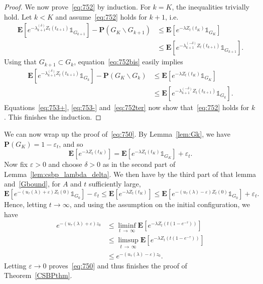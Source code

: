 \documentclass[AHL,Unicode,longabstracts,published]{cedram}
\newcommand*\ep{\varepsilon}
\newcommand*\eps{\varepsilon}
\newcommand*\E{\mathbf{E}}
\renewcommand*\P{\mathbf{P}}
\newcommand{\1} {\mathds{1}}
\renewcommand*\to{\rightarrow}
\begin{document}
\begin{proof}
We now prove~\eqref{eq:752} by induction. For $k=K$, the inequalities trivially hold. Let $k<K$ and assume~\eqref{eq:752} holds for $k+1$, i.e.
\begin{equation}\label{eq:752bis}
\begin{split}
\E\left[e^{-\lambda_{k+1}^{(\delta)}Z_t\left(t_{k+1}\right)}\1_{G_{k+1}}\right] -\P\left(G_K\backslash G_{k+1}\right)
&\le \E\left[e^{-\lambda Z_t(t_K)}\1_{G_K}\right]\\
&\le \E\left[e^{-\lambda_{k+1}^{(-\delta)}Z_t\left(t_{k+1}\right)}\1_{G_{k+1}}\right].
\end{split}
\end{equation}
Using that $G_{k+1}\subset G_k$, equation~\eqref{eq:752bis} easily implies
\begin{equation}\label{eq:752ter}
\begin{split}
\E\left[e^{-\lambda_{k+1}^{(\delta)}Z_t\left(t_{k+1}\right)}\1_{G_k}\right] -\P\left(G_K\backslash G_k\right)
&\le \E\left[e^{-\lambda Z_t(t_K)}\1_{G_K}\right]\\
&\le \E\left[e^{-\lambda_{k+1}^{(-\delta)}Z_t\left(t_{k+1}\right)}\1_{G_k}\right].
\end{split}
\end{equation}
Equations~\eqref{eq:753+}, \eqref{eq:753-} and~\eqref{eq:752ter} now show that~\eqref{eq:752} holds for $k$. This finishes the induction.
\end{proof}

We can now wrap up the proof of~\eqref{eq:750}. By Lemma~\ref{lem:Gk}, we have $\P(G_K) = 1-\eps_t$, and so
\begin{equation}\label{Gbound}
\E\left[e^{-\lambda Z_t(t_K)}\right] = \E\left[e^{-\lambda Z_t(t_K)}\1_{G_K}\right] + \eps_t.
\end{equation}
Now fix $\ep>0$ and choose $\delta>0$ as in the second part of Lemma~\ref{lem:csbp_lambda_delta}. We then have by the third part of that lemma and~\eqref{Gbound}, for $A$ and $t$ sufficiently large,
\[
\E\left[e^{-\left(u_\tau(\lambda)+\ep\right)Z_t(0)}\1_{G_0}\right]-\eps_t\le \E\left[e^{-\lambda Z_t(t_K)}\right] \le \E\left[e^{-\left(u_\tau(\lambda)-\ep\right)Z_t(0)}\1_{G_0}\right]+\eps_t.
\]
Hence, letting $t\to\infty$, and using the assumption on the initial configuration, we have
\begin{align*}
e^{-\left(u_\tau(\lambda)+\ep\right)z_0} &\le \liminf_{t\,\to\,\infty} \E\left[e^{-\lambda Z_t\left(t\left(1-e^{-\tau}\right)\right)}\right]\\ &\le \limsup_{t\,\to\,\infty} \E\left[e^{-\lambda Z_t\left(t\left(1-e^{-\tau}\right)\right)}\right] \\
&\le e^{-\left(u_\tau(\lambda)-\ep\right)z_0}.
\end{align*}
Letting $\ep \to0$ proves~\eqref{eq:750} and thus finishes the proof of Theorem~\ref{CSBPthm}.
\vspace{45pt}


\end{document}
